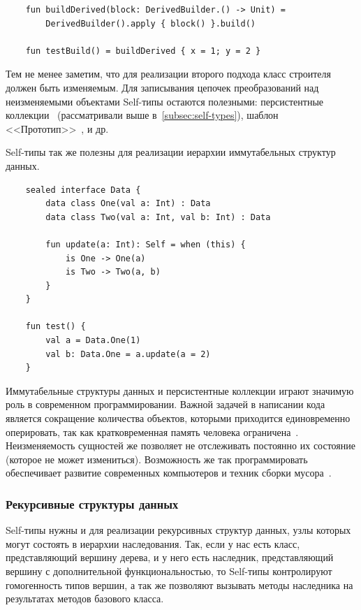 \begin{verbatim}
    fun buildDerived(block: DerivedBuilder.() -> Unit) =
        DerivedBuilder().apply { block() }.build()

    fun testBuild() = buildDerived { x = 1; y = 2 }
\end{verbatim}

Тем не менее заметим, что для реализации второго подхода класс строителя должен быть изменяемым.
Для записывания цепочек преобразований над неизменяемыми объектами Self-типы остаются полезными: персистентные коллекции~\cite{okasaki1999purely} (рассматривали выше в~\ref{subsec:self-types}), шаблон <<Прототип>>~\cite{hannemann2002design}, и др.

Self-типы так же полезны для реализации иерархии иммутабельных структур данных.

\begin{verbatim}
    sealed interface Data {
        data class One(val a: Int) : Data
        data class Two(val a: Int, val b: Int) : Data

        fun update(a: Int): Self = when (this) {
            is One -> One(a)
            is Two -> Two(a, b)
        }
    }

    fun test() {
        val a = Data.One(1)
        val b: Data.One = a.update(a = 2)
    }
\end{verbatim}

Иммутабельные структуры данных и персистентные коллекции играют значимую роль в современном программировании.
Важной задачей в написании кода является сокращение количества объектов, которыми приходится единовременно оперировать, так как кратковременная память человека ограничена~\cite{lisman1995storage}.
Неизменяемость сущностей же позволяет не отслеживать постоянно их состояние (которое не может измениться).
Возможность же так программировать обеспечивает развитие современных компьютеров и техник сборки мусора~\cite{jones2016garbage}.

\subsubsection{Рекурсивные структуры данных}

Self-типы нужны и для реализации рекурсивных структур данных, узлы которых могут состоять в иерархии наследования.
Так, если у нас есть класс, представляющий вершину дерева, и у него есть наследник, представляющий вершину с дополнительной функциональностью, то Self-типы контролируют гомогенность типов вершин, а так же позволяют вызывать методы наследника на результатах методов базового класса.

